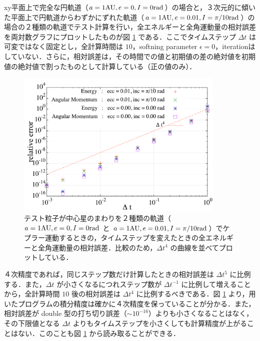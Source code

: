 \documentclass[11pt,a4paper,oneside,onecolumn]{jreport}
\begin{document}
xy平面上で完全な円軌道（$a = 1 {\rm AU}, e = 0, I = 0 {\rm rad}$）の場合と，３次元的に傾いた平面上で円軌道からわずかにずれた軌道（$a = 1 {\rm AU}, e = 0.01, I = \pi / 10 {\rm rad}$）の場合の２種類の軌道でテスト計算を行い，全エネルギーと全角運動量の相対誤差を両対数グラフにプロットしたものが図 \ref{fig:relative_error} である．ここでタイムステップ $\Delta t$ は可変ではなく固定とし，全計算時間は $10$，softning parameter $\epsilon = 0$，iterationはしていない．さらに，相対誤差は，その時間での値と初期値の差の絶対値を初期値の絶対値で割ったものとして計算している（正の値のみ）．
\begin{figure}[H]
\centering
\includegraphics[width=10cm]{./image/relative_error.pdf}
\caption{テスト粒子が中心星のまわりを２種類の軌道（$a = 1 {\rm AU}, e = 0, I = 0 {\rm rad}$ と $a = 1 {\rm AU}, e = 0.01, I = \pi / 10 {\rm rad}$）でケプラー運動するときの，タイムステップを変えたときの全エネルギーと全角運動量の相対誤差．比較のため，$\Delta t^4$ の曲線を並べてプロットしている．\label{fig:relative_error}}
\end{figure}
４次精度であれば，同じステップ数だけ計算したときの相対誤差は $\Delta t^5$ に比例する．また，$\Delta t$ が小さくなるにつれステップ数が $\Delta t^{-1}$ に比例して増えることから，全計算時間 $10$ 後の相対誤差は $\Delta t^4$ に比例するべきである．図 \ref{fig:relative_error} より，用いたプログラムの積分精度は確かに４次精度を保っていることが分かる．また，相対誤差が double 型の打ち切り誤差（$\sim 10^{-16}$）よりも小さくなることはなく，その下限値となる $\Delta t$ よりもタイムステップを小さくしても計算精度が上がることはない．このことも図 \ref{fig:relative_error} から読み取ることができる．
\end{document}
